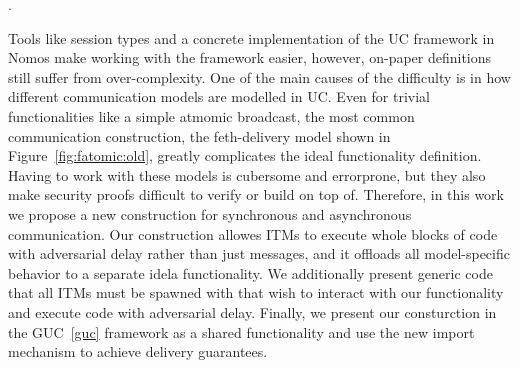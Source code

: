 



.







Tools like session types and a concrete implementation of the UC framework in Nomos make working with the framework easier, however, on-paper definitions still suffer from over-complexity.
One of the main causes of the difficulty is in how different communication models are modelled in UC.
Even for trivial functionalities like a simple atmomic broadcast, the most common communication construction, the feth-delivery model shown in Figure~\ref{fig:fatomic:old}, greatly complicates the ideal functionality definition.
Having to work with these models is cubersome and errorprone, but they also make security proofs difficult to verify or build on top of.
Therefore, in this work we propose a new construction for synchronous and asynchronous communication.
Our construction allowes ITMs to execute whole blocks of code with adversarial delay rather than just messages, and it offloads all model-specific behavior to a separate idela functionality.
We additionally present generic code that all ITMs must be spawned with that wish to interact with our functionality and execute code with adversarial delay.
Finally, we present our consturction in the GUC~\ref{guc} framework as a shared functionality and use the new import mechanism to achieve delivery guarantees.

